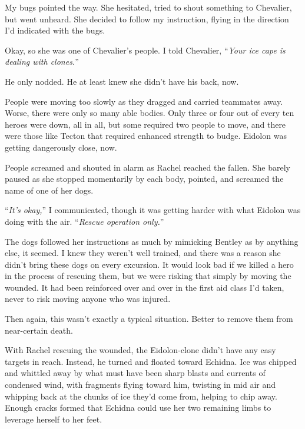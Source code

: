 My bugs pointed the way.  She hesitated, tried to shout something to Chevalier, but went unheard.  She decided to follow my instruction, flying in the direction I'd indicated with the bugs.



Okay, so she was one of Chevalier's people.  I told Chevalier, ``\emph{Your ice cape is dealing with clones.}''



He only nodded.  He at least knew she didn't have his back, now.



People were moving too slowly as they dragged and carried teammates away.  Worse, there were only so many able bodies.  Only three or four out of every ten heroes were down, all in all, but some required two people to move, and there were those like Tecton that required enhanced strength to budge.  Eidolon was getting dangerously close, now.



People screamed and shouted in alarm as Rachel reached the fallen.  She barely paused as she stopped momentarily by each body, pointed, and screamed the name of one of her dogs.



``\emph{It's okay,}'' I communicated, though it was getting harder with what Eidolon was doing with the air.  ``\emph{Rescue operation only.}''



The dogs followed her instructions as much by mimicking Bentley as by anything else, it seemed.  I knew they weren't well trained, and there was a reason she didn't bring these dogs on every excursion.  It would look bad if we killed a hero in the process of rescuing them, but we were risking that simply by moving the wounded.  It had been reinforced over and over in the first aid class I'd taken, never to risk moving anyone who was injured.



Then again, this wasn't exactly a typical situation.  Better to remove them from near-certain death.



With Rachel rescuing the wounded, the Eidolon-clone didn't have any easy targets in reach.  Instead, he turned and floated toward Echidna.  Ice was chipped and whittled away by what must have been sharp blasts and currents of condensed wind, with fragments flying toward him, twisting in mid air and whipping back at the chunks of ice they'd come from, helping to chip away.  Enough cracks formed that Echidna could use her two remaining limbs to leverage herself to her feet.



